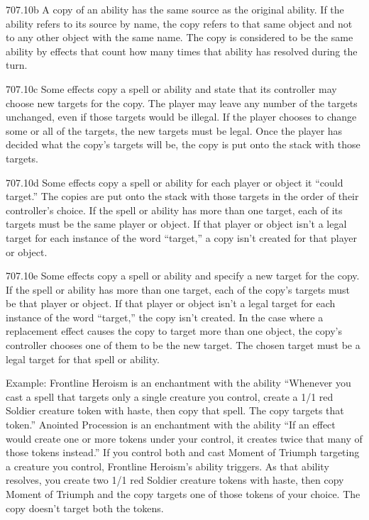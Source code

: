 707.10b A copy of an ability has the same source as the original ability. If the ability refers to its source by name, the copy refers to that same object and not to any other object with the same name. The copy is considered to be the same ability by effects that count how many times that ability has resolved during the turn.

707.10c Some effects copy a spell or ability and state that its controller may choose new targets for the copy. The player may leave any number of the targets unchanged, even if those targets would be illegal. If the player chooses to change some or all of the targets, the new targets must be legal. Once the player has decided what the copy’s targets will be, the copy is put onto the stack with those targets.

707.10d Some effects copy a spell or ability for each player or object it “could target.” The copies are put onto the stack with those targets in the order of their controller’s choice. If the spell or ability has more than one target, each of its targets must be the same player or object. If that player or object isn’t a legal target for each instance of the word “target,” a copy isn’t created for that player or object.

707.10e Some effects copy a spell or ability and specify a new target for the copy. If the spell or ability has more than one target, each of the copy’s targets must be that player or object. If that player or object isn’t a legal target for each instance of the word “target,” the copy isn’t created. In the case where a replacement effect causes the copy to target more than one object, the copy’s controller chooses one of them to be the new target. The chosen target must be a legal target for that spell or ability.

Example: Frontline Heroism is an enchantment with the ability “Whenever you cast a spell that targets only a single creature you control, create a 1/1 red Soldier creature token with haste, then copy that spell. The copy targets that token.” Anointed Procession is an enchantment with the ability “If an effect would create one or more tokens under your control, it creates twice that many of those tokens instead.” If you control both and cast Moment of Triumph targeting a creature you control, Frontline Heroism’s ability triggers. As that ability resolves, you create two 1/1 red Soldier creature tokens with haste, then copy Moment of Triumph and the copy targets one of those tokens of your choice. The copy doesn’t target both the tokens.


